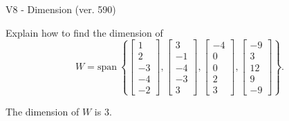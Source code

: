 \begin{exercise}
  \begin{exerciseTitle}V8 - Dimension (ver. 590)\end{exerciseTitle}
  \begin{exerciseStatement}
    Explain how to find the dimension of 
\[W=\mathrm{span}\ \left\{\left[\begin{array}{r}
1 \\
2 \\
-3 \\
-4 \\
-2
\end{array}\right] , \left[\begin{array}{r}
3 \\
-1 \\
-4 \\
-3 \\
3
\end{array}\right] , \left[\begin{array}{r}
-4 \\
0 \\
0 \\
2 \\
3
\end{array}\right] , \left[\begin{array}{r}
-9 \\
3 \\
12 \\
9 \\
-9
\end{array}\right]\right\}.\]



  \end{exerciseStatement}
  \begin{exerciseAnswer}
   The dimension of \(W\) is  \(3\).
  


  \end{exerciseAnswer}
\end{exercise}
